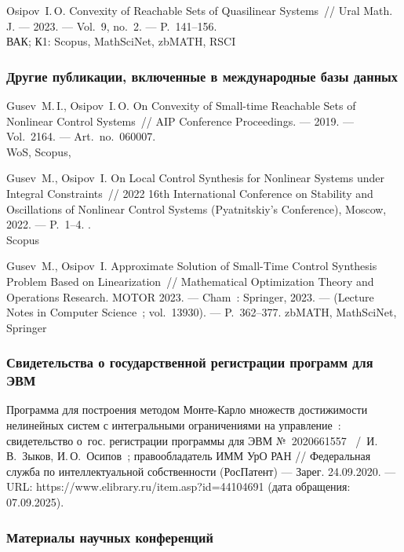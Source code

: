 Osipov~I.\,O. Convexity of Reachable Sets of Quasilinear Systems~// Ural Math. J. --- 2023. --- Vol.~9, no.~2. --- P.~141--156.
 \\
ВАК; К1: Scopus, MathSciNet, zbMATH, RSCI


\subsubsection*{Другие публикации, включенные в международные базы данных}
Gusev~M.\,I., Osipov~I.\,O. On Convexity of Small-time Reachable Sets of Nonlinear Control Systems~// AIP Conference Proceedings. --- 2019. --- Vol.~2164. --- Art.~no.~060007.
 \\
WoS, Scopus,

Gusev~M., Osipov~I. On Local Control Synthesis for Nonlinear Systems under Integral Constraints~// 2022 16th International Conference on Stability and Oscillations of Nonlinear Control Systems (Pyatnitskiy's Conference), Moscow, 2022. --- P.~1--4. .\\
Scopus

Gusev~M., Osipov~I. Approximate Solution of Small-Time Control Synthesis Problem Based on Linearization~// Mathematical Optimization Theory and Operations Research. MOTOR 2023. --- Cham~: Springer, 2023. --- (Lecture Notes in Computer Science~; vol.~13930). --- P.~362--377.
zbMATH, MathSciNet, Springer

\subsubsection*{Свидетельства о государственной регистрации программ для ЭВМ}
Программа для построения методом Монте-Карло множеств достижимости нелинейных систем с интегральными ограничениями на управление~: свидетельство о~гос. регистрации программы для ЭВМ №~2020661557 ~/~И.\,В.~Зыков, И.\,О.~Осипов~; правообладатель ИММ УрО РАН // Федеральная служба по интеллектуальной собственности (РосПатент) --- Зарег. 24.09.2020. --- URL: https://www.elibrary.ru/item.asp?id=44104691 (дата обращения: 07.09.2025).

\subsubsection*{Материалы научных конференций}

